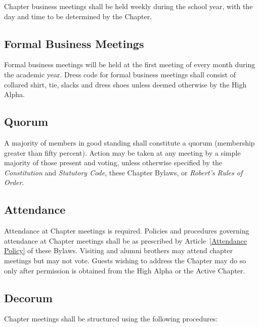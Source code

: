 \documentclass{article}
\begin{document}
Chapter business meetings shall be held weekly during the school year, with the
day and time to be determined by the Chapter.

\subsection{Formal Business Meetings}

Formal business meetings will be held at the first meeting of every month during
the academic year. Dress code for formal business meetings shall consist of
collared shirt, tie, slacks and dress shoes unless deemed otherwise by the High
Alpha.

\subsection{Quorum}

A majority of members in good standing shall constitute a quorum (membership
greater than fifty percent). Action may be taken at any meeting by a simple
majority of those present and voting, unless otherwise specified by the
\emph{Constitution} and \emph{Statutory Code}, these Chapter Bylaws, or
\emph{Robert’s Rules of Order}.

\subsection{Attendance}

Attendance at Chapter meetings is required. Policies and procedures governing
attendance at Chapter meetings shall be as prescribed by
Article~\ref{Attendance Policy} of these Bylaws. Visiting and alumni brothers
may attend chapter meetings but may not vote. Guests wishing to address the
Chapter may do so only after permission is obtained from the High Alpha or the
Active Chapter.

\subsection{Decorum}

Chapter meetings shall be structured using the following procedures:
\end{document}
